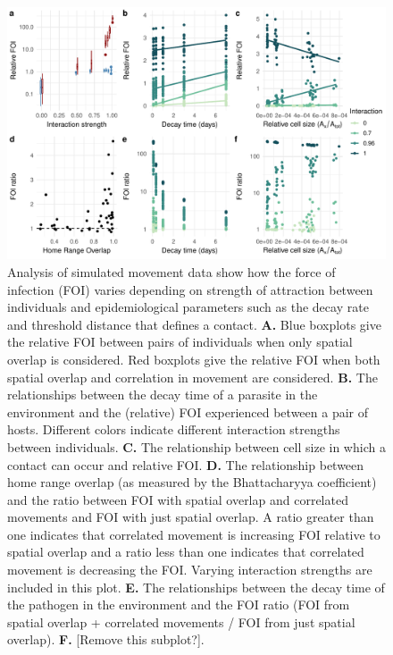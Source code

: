 \documentclass[letterpaper]{article}
\begin{document}
\begin{figure}
    \includegraphics[width=\textwidth]{figures/sim_results.pdf}
    \caption{Analysis of simulated movement data show how the force of infection (FOI) varies depending on strength of attraction between individuals and epidemiological parameters such as the decay rate and threshold distance that defines a contact.  \textbf{A.} Blue boxplots give the relative FOI between pairs of individuals when only spatial overlap is considered. Red boxplots give the relative FOI when both spatial overlap and correlation in movement are considered.  \textbf{B.} The relationships between the decay time of a parasite in the environment and the (relative) FOI experienced between a pair of hosts. Different colors indicate different interaction strengths between individuals. \textbf{C.} The relationship between cell size in which a contact can occur and relative FOI. \textbf{D.} The relationship between home range overlap (as measured by the Bhattacharyya coefficient) and the ratio between FOI with spatial overlap and correlated movements and FOI with just spatial overlap.  A ratio greater than one indicates that correlated movement is increasing FOI relative to spatial overlap and a ratio less than one indicates that correlated movement is decreasing the FOI. Varying interaction strengths are included in this plot. \textbf{E.} The relationships between the decay time of the pathogen in the environment and the FOI ratio (FOI from spatial overlap + correlated movements / FOI from just spatial overlap). \textbf{F.} [Remove this subplot?]. }
	\label{fig:simresults}
\end{figure}
\end{document}

